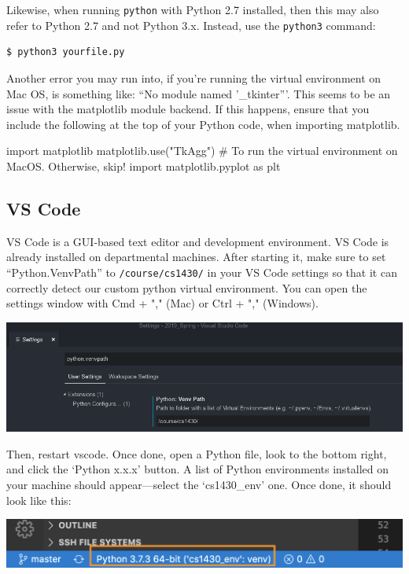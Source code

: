 \documentclass{article}
\begin{document}
Likewise, when running \texttt{python} with Python 2.7 installed, then this may also refer to Python 2.7 and not Python 3.x. Instead, use the \texttt{python3} command:
\begin{verbatim}
$ python3 yourfile.py
\end{verbatim}

Another error you may run into, if you're running the virtual environment on Mac OS, is something like: ``No module named '\_tkinter'''. This seems to be an issue with the matplotlib module backend. If this happens, ensure that you include the following at the top of your Python code, when importing matplotlib.
\begin{python}
import matplotlib
matplotlib.use("TkAgg") # To run the virtual environment on MacOS. Otherwise, skip!
import matplotlib.pyplot as plt
\end{python}

\subsection{VS Code}
VS Code is a GUI-based text editor and development environment. VS Code is already installed on departmental machines. After starting it, make sure to set ``Python.VenvPath'' to \texttt{/course/cs1430/} in your VS Code settings so that it can correctly detect our custom python virtual environment. You can open the settings window with Cmd + "," (Mac) or Ctrl + "," (Windows).

\includegraphics[width=\linewidth]{VenvPath.png}

Then, restart vscode. Once done, open a Python file, look to the bottom right, and click the `Python x.x.x' button. A list of Python environments installed on your machine should appear---select the `cs1430\_env' one. Once done, it should look like this:

\includegraphics[width=\linewidth]{VSCode_VenvCorrect.png}
\end{document}
